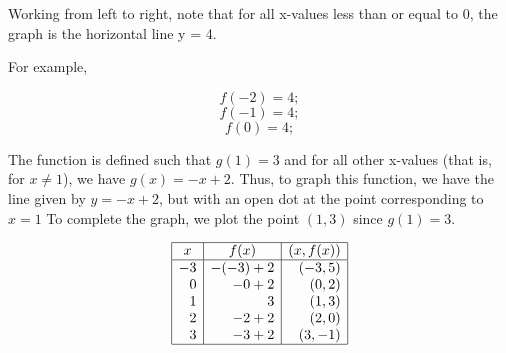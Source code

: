 \documentclass{report}
\begin{document}
\noindent Working from left to right, note that for all x-values less than or equal to 0, the graph is the horizontal line y = 4. 
\vspace{2mm}

\noindent For example,

$$ f(-2) = 4;$$
$$ f(-1) =4;$$
$$ f(0) = 4;$$
\bigbreak \noindent \bigbreak \noindent
{}
\bigbreak \noindent
{}

The function is defined such that $g(1) = 3$ and for all other x-values (that is, for $x \neq 1$), we have $g(x) = -x + 2$. Thus, to graph this function, we have the line given by $y = -x + 2$, but with an open dot at the point corresponding to $x = 1$ To complete the graph, we plot the point $(1,3)$ since $g(1) = 3$.
\bigbreak \noindent
\begin{minipage}{0.5\textwidth}
  \centering %
  \[
  \begin{array}{|r|r|r|}
    \hline
    \multicolumn{1}{|c|}{x} & \multicolumn{1}{c|}{f(x)} & \multicolumn{1}{c|}{(x, f(x))} \\
    \hline
    -3 & -(-3) + 2 & (-3,5) \\
    0 & -0 + 2 & (0,2) \\
    1 & 3 & (1,3) \\
    2 & -2 + 2 & (2,0) \\
    3 & -3 + 2 & (3,-1) \\
    \hline
  \end{array}
  \]
\end{minipage}%
\hspace{-0.1\textwidth}%
\begin{minipage}{0.45\textwidth}
  \centering %
\end{minipage}
\end{document}
